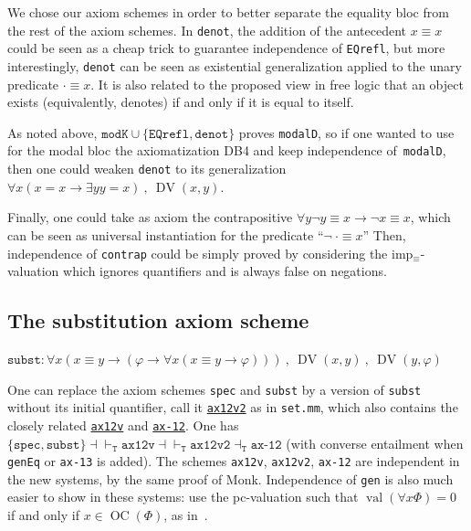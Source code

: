 \documentclass[11pt]{article}
\newcommand*{\comma}{\:,\:}
\renewcommand*{\phi}{\varphi}
\DeclareMathOperator{\DV}{DV}
\DeclareMathOperator{\OC}{OC}
\DeclareMathOperator{\val}{val}
\theoremstyle{plain}
\theoremstyle{definition}
\theoremstyle{remark}
\begin{document}
We chose our axiom schemes in order to better separate the equality bloc from the rest of the axiom schemes.
In \texttt{denot}, the addition of the antecedent $x \equiv x$ could be seen as a cheap trick to guarantee independence of \texttt{EQrefl}, but more interestingly, \texttt{denot} can be seen as existential generalization applied to the unary predicate $\bm{\cdot} \equiv x$.
It is also related to the proposed view in free logic that an object exists (equivalently, denotes) if and only if it is equal to itself.



As noted above, $\texttt{modK} \cup \{ \texttt{EQrefl}, \texttt{denot} \}$ proves \texttt{modalD},
so if one wanted to use for the modal bloc the axiomatization DB4 and keep independence
of~\texttt{modalD}, then one could weaken \texttt{denot} to its generalization
$\forall x (x = x \to \exists y y = x) \comma \DV(x, y)$.

Finally, one could take as axiom the contrapositive $\forall y \neg y \equiv x \to \neg x \equiv x$,
which can be seen as universal instantiation for the predicate ``$\neg \:\bm{\cdot} \equiv x$''
Then, independence of \texttt{contrap} could be simply proved by considering the
imp$_\equiv$-valuation which ignores quantifiers and is always false on negations.



\subsection{The substitution axiom scheme}

$\texttt{subst}:
\forall x (x \equiv y \to (\phi \to \forall x ( x \equiv y \to \phi))) \comma \DV(x, y)\comma \DV(y, \phi)$
\vspace{0.5em}

One can replace the axiom schemes \texttt{spec} and \texttt{subst} by a version of \texttt{subst}
without its initial quantifier, call it
\href{https://us.metamath.org/mpeuni/ax12v2.html}{\texttt{ax12v2}} as in \texttt{set.mm}, which
also contains the closely related \href{https://us.metamath.org/mpeuni/ax12v.html}{\texttt{ax12v}}
and \href{https://us.metamath.org/mpeuni/ax-12.html}{\texttt{ax-12}}.
One has $\{\texttt{spec}, \texttt{subst}\} \dashv\vdash_\texttt{T} \texttt{ax12v} \dashv\vdash_\texttt{T} \texttt{ax12v2}\dashv_\texttt{T} \texttt{ax-12}$ (with converse entailment when \texttt{genEq}
or \texttt{ax-13} is added).
The schemes \texttt{ax12v}, \texttt{ax12v2}, \texttt{ax-12} are independent in the new systems, by
the same proof of Monk.
Independence of \texttt{gen} is also much easier to show in these systems: use the pc-valuation such
that $\val(\forall x \Phi)=0$ if and only if $x \in \OC(\Phi)$, as in~\cite{km}.
\end{document}
